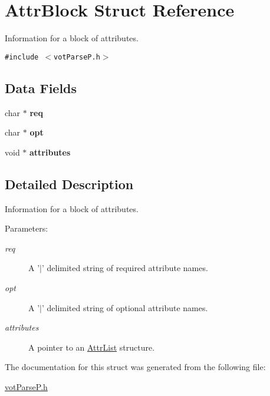 \hypertarget{structAttrBlock}{
\section{AttrBlock Struct Reference}
\label{structAttrBlock}
}
Information for a block of attributes.  


{\tt \#include $<$votParseP.h$>$}

\subsection*{Data Fields}
\begin{CompactItemize}
\item 
\hypertarget{structAttrBlock_fa9326ebb9e46e6f599d80f67db42cb6}{
char $\ast$ \textbf{req}}
\label{structAttrBlock_fa9326ebb9e46e6f599d80f67db42cb6}

\item 
\hypertarget{structAttrBlock_c96c734b9124fcdba0ebbb5f8703c940}{
char $\ast$ \textbf{opt}}
\label{structAttrBlock_c96c734b9124fcdba0ebbb5f8703c940}

\item 
\hypertarget{structAttrBlock_6d23c0d081bb527c934e99f47b10c461}{
void $\ast$ \textbf{attributes}}
\label{structAttrBlock_6d23c0d081bb527c934e99f47b10c461}

\end{CompactItemize}


\subsection{Detailed Description}
Information for a block of attributes. 

\begin{Desc}
\item[Parameters:]
\begin{description}
\item[{\em req}]A '$|$' delimited string of required attribute names. \item[{\em opt}]A '$|$' delimited string of optional attribute names. \item[{\em attributes}]A pointer to an \hyperlink{structAttrList}{AttrList} structure. \end{description}
\end{Desc}


The documentation for this struct was generated from the following file:\begin{CompactItemize}
\item 
\hyperlink{votParseP_8h}{votParseP.h}\end{CompactItemize}
